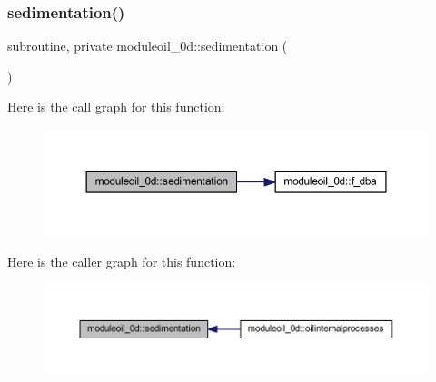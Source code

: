 \subsubsection{\texorpdfstring{sedimentation()}{sedimentation()}}
{\footnotesize\ttfamily subroutine, private moduleoil\+\_\+0d\+::sedimentation (\begin{DoxyParamCaption}{ }\end{DoxyParamCaption})\hspace{0.3cm}{\ttfamily [private]}}

Here is the call graph for this function\+:\nopagebreak
\begin{figure}[H]
\begin{center}
\leavevmode
\includegraphics[width=350pt]{namespacemoduleoil__0d_a45b30490a7ce5da933ae0f54cfea07d9_cgraph}
\end{center}
\end{figure}
Here is the caller graph for this function\+:\nopagebreak
\begin{figure}[H]
\begin{center}
\leavevmode
\includegraphics[width=350pt]{namespacemoduleoil__0d_a45b30490a7ce5da933ae0f54cfea07d9_icgraph}
\end{center}
\end{figure}
\mbox{\label{namespacemoduleoil__0d_a7a8a1d1d956230a40fa8f10e664138e3}} 
